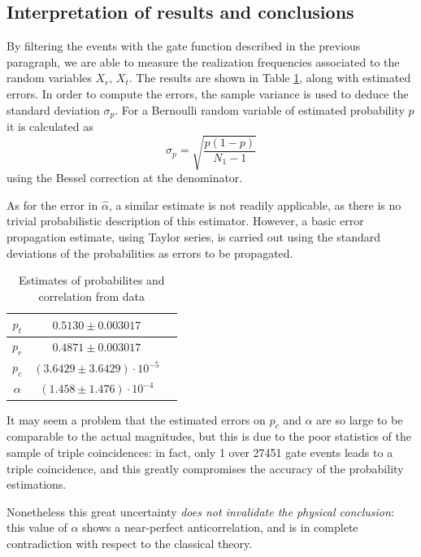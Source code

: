 \documentclass[10pt, final]{article}
\begin{document}
\begin{multicols}{2}
\subsection*{Interpretation of results and conclusions}
By filtering the events with the gate function described in the previous paragraph, we are able to measure the realization frequencies associated to the random variables $X_r, \, X_t$. The results are shown in Table \ref{result}, along with estimated errors.
In order to compute the errors, the sample variance is used to deduce the standard deviation $\sigma_{p}$. For a Bernoulli random variable of estimated probability $p$ it is calculated as
\begin{equation*}
    \sigma_{p} = \sqrt{\frac{p(1-p)}{N_1-1}}
\end{equation*}
using the Bessel correction at the denominator.

As for the error in $\hat{\alpha}$, a similar estimate is not readily applicable, as there is no trivial probabilistic description of this estimator. However, a basic error propagation estimate, using Taylor series, is carried out using the standard deviations of the probabilities as errors to be propagated. 
\renewcommand{\arraystretch}{1.5}
\begin{mdframed}
    \begin{table}[H]
        \centering
        \begin{tabular}{|c|c|c|}
            \hline
            $p_t$ & $0.5130 \pm 0.003017$\\
            \hline
            $p_r$ & $0.4871 \pm 0.003017$\\
            \hline
            $p_c$ & $(3.6429 \pm 3.6429) \cdot 10^{-5}$\\
            \hline
            $\alpha$ & $(1.458  \pm 1.476) \cdot 10^{-4}$\\
            \hline
        \end{tabular}
        \caption{Estimates of probabilites and correlation from data}
        \label{result}
    \end{table}
\end{mdframed}
It may seem a problem that the estimated errors on $p_c$ and $\alpha$ are so large to be comparable to the actual magnitudes, but this is due to the poor statistics of the sample of triple coincidences: in fact, only 1 over 27451 gate events leads to a triple coincidence, and this greatly compromises the accuracy of the probability estimations. 

Nonetheless this great uncertainty \emph{does not invalidate the physical conclusion}: this value of $\alpha$ shows a near-perfect anticorrelation, and is in complete contradiction with respect to the classical theory. 



\end{multicols}
\end{document}
